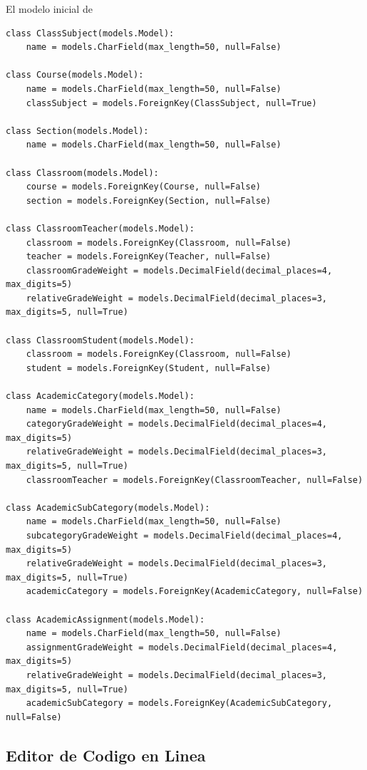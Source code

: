 El modelo inicial de 
\lstset{language=Python}
\begin{lstlisting}
class ClassSubject(models.Model):
    name = models.CharField(max_length=50, null=False)

class Course(models.Model):
    name = models.CharField(max_length=50, null=False)
    classSubject = models.ForeignKey(ClassSubject, null=True)

class Section(models.Model):
    name = models.CharField(max_length=50, null=False)

class Classroom(models.Model):
    course = models.ForeignKey(Course, null=False)
    section = models.ForeignKey(Section, null=False)

class ClassroomTeacher(models.Model):
    classroom = models.ForeignKey(Classroom, null=False)
    teacher = models.ForeignKey(Teacher, null=False)
    classroomGradeWeight = models.DecimalField(decimal_places=4, max_digits=5)
    relativeGradeWeight = models.DecimalField(decimal_places=3, max_digits=5, null=True)

class ClassroomStudent(models.Model):
    classroom = models.ForeignKey(Classroom, null=False)
    student = models.ForeignKey(Student, null=False)

class AcademicCategory(models.Model):
    name = models.CharField(max_length=50, null=False)
    categoryGradeWeight = models.DecimalField(decimal_places=4, max_digits=5)
    relativeGradeWeight = models.DecimalField(decimal_places=3, max_digits=5, null=True)
    classroomTeacher = models.ForeignKey(ClassroomTeacher, null=False)

class AcademicSubCategory(models.Model):
    name = models.CharField(max_length=50, null=False)
    subcategoryGradeWeight = models.DecimalField(decimal_places=4, max_digits=5)
    relativeGradeWeight = models.DecimalField(decimal_places=3, max_digits=5, null=True)
    academicCategory = models.ForeignKey(AcademicCategory, null=False)

class AcademicAssignment(models.Model):
    name = models.CharField(max_length=50, null=False)
    assignmentGradeWeight = models.DecimalField(decimal_places=4, max_digits=5)
    relativeGradeWeight = models.DecimalField(decimal_places=3, max_digits=5, null=True)
    academicSubCategory = models.ForeignKey(AcademicSubCategory, null=False)
\end{lstlisting}
\lstset{language=Bash}

\subsection{Editor de Codigo en Linea}

